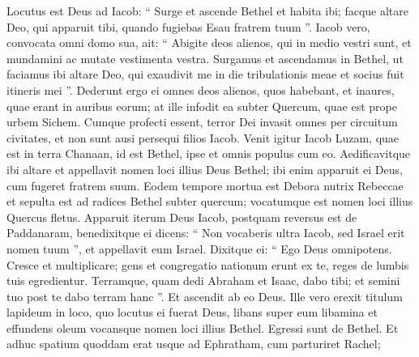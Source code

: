 \begin{biblechapter}
\begin{biblechapter}
\begin{biblechapter}
\begin{biblechapter}
\begin{biblechapter}
\begin{biblechapter}
\begin{biblechapter}
\begin{biblechapter}
\begin{biblechapter}
\begin{biblechapter}
\begin{biblechapter}
\begin{biblechapter}
\begin{biblechapter}
\begin{biblechapter}
\begin{biblechapter}
\begin{biblechapter}
\begin{biblechapter}
\begin{biblechapter}
\begin{biblechapter}
\begin{biblechapter}
\begin{biblechapter}
\begin{biblechapter}
\begin{biblechapter}
\begin{biblechapter}
\begin{biblechapter}
\begin{biblechapter}
\begin{biblechapter}
\begin{biblechapter}
\begin{biblechapter}
\begin{biblechapter}
\begin{biblechapter}
\begin{biblechapter}
\begin{biblechapter}
\begin{biblechapter}
\begin{biblechapter}
\verse Locutus est Deus ad Iacob: “ Surge et ascende Bethel et habita ibi; facque altare Deo, qui apparuit tibi, quando fugiebas Esau fratrem tuum ”. 
\verse Iacob vero, convocata omni domo sua, ait: “ Abigite deos alienos, qui in medio vestri sunt, et mundamini ac mutate vestimenta vestra. 
\verse Surgamus et ascendamus in Bethel, ut faciamus ibi altare Deo, qui exaudivit me in die tribulationis meae et socius fuit itineris mei ”. 
\verse Dederunt ergo ei omnes deos alienos, quos habebant, et inaures, quae erant in auribus eorum; at ille infodit ea subter Quercum, quae est prope urbem Sichem. 
\verse Cumque profecti essent, terror Dei invasit omnes per circuitum civitates, et non sunt ausi persequi filios Iacob.
 \verse Venit igitur Iacob Luzam, quae est in terra Chanaan, id est Bethel, ipse et omnis populus cum eo. 
\verse Aedificavitque ibi altare et appellavit nomen loci illius Deus Bethel; ibi enim apparuit ei Deus, cum fugeret fratrem suum. 
\verse Eodem tempore mortua est Debora nutrix Rebeccae et sepulta est ad radices Bethel subter quercum; vocatumque est nomen loci illius Quercus fletus.
 \verse Apparuit iterum Deus Iacob, postquam reversus est de Paddanaram, benedixitque ei 
\verse dicens: “ Non vocaberis ultra Iacob, sed Israel erit nomen tuum ”, et appellavit eum Israel. 
\verse Dixitque ei: “ Ego Deus omnipotens. Cresce et multiplicare; gens et congregatio nationum erunt ex te, reges de lumbis tuis egredientur. 
\verse Terramque, quam dedi Abraham et Isaac, dabo tibi; et semini tuo post te dabo terram hanc ”. 
\verse Et ascendit ab eo Deus.
 \verse Ille vero erexit titulum lapideum in loco, quo locutus ei fuerat Deus, libans super eum libamina et effundens oleum 
\verse vocansque nomen loci illius Bethel.
 \verse Egressi sunt de Bethel. Et adhuc spatium quoddam erat usque ad Ephratham, cum parturiret Rachel; 

\end{biblechapter}
\end{biblechapter}
\end{biblechapter}
\end{biblechapter}
\end{biblechapter}
\end{biblechapter}
\end{biblechapter}
\end{biblechapter}
\end{biblechapter}
\end{biblechapter}
\end{biblechapter}
\end{biblechapter}
\end{biblechapter}
\end{biblechapter}
\end{biblechapter}
\end{biblechapter}
\end{biblechapter}
\end{biblechapter}
\end{biblechapter}
\end{biblechapter}
\end{biblechapter}
\end{biblechapter}
\end{biblechapter}
\end{biblechapter}
\end{biblechapter}
\end{biblechapter}
\end{biblechapter}
\end{biblechapter}
\end{biblechapter}
\end{biblechapter}
\end{biblechapter}
\end{biblechapter}
\end{biblechapter}
\end{biblechapter}
\end{biblechapter}
